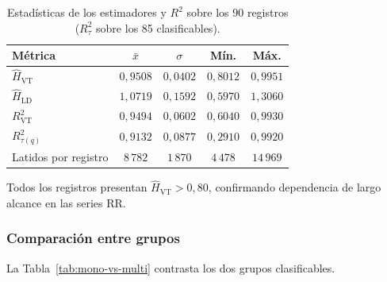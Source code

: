\begin{table}[H]
\centering
\caption{Estadísticas de los estimadores y $R^2$ sobre los 90 registros
         ($R^2_{\tau}$ sobre los 85 clasificables).}
\label{tab:estadisticas-h}
\renewcommand{\arraystretch}{1.3}
\begin{tabular}{lcccc}
    \toprule
    \textbf{Métrica} & $\bar{x}$ & $\sigma$ & \textbf{Mín.} & \textbf{Máx.} \\
    \midrule
    $\hat{H}_{\text{VT}}$  & $0{,}9508$ & $0{,}0402$ & $0{,}8012$ & $0{,}9951$ \\
    $\hat{H}_{\text{LD}}$  & $1{,}0719$ & $0{,}1592$ & $0{,}5970$ & $1{,}3060$ \\
    $R^2_{\text{VT}}$      & $0{,}9494$ & $0{,}0602$ & $0{,}6040$ & $0{,}9930$ \\
    $R^2_{\tau(q)}$         & $0{,}9132$ & $0{,}0877$ & $0{,}2910$ & $0{,}9920$ \\
    Latidos por registro    & $8\,782$   & $1\,870$   & $4\,478$   & $14\,969$  \\
    \bottomrule
\end{tabular}
\end{table}

Todos los registros presentan $\hat{H}_{\text{VT}} > 0{,}80$, confirmando
dependencia de largo alcance en las series RR.

\subsubsection{Comparación entre grupos}

La Tabla~\ref{tab:mono-vs-multi} contrasta los dos grupos clasificables.

